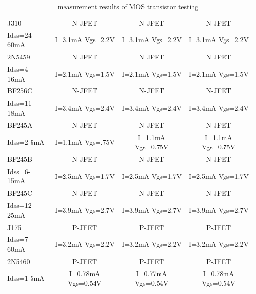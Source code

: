 \begin{table}[H]
\begin{center}
\begin{tabular}{| l | c | c | c |}
    \hline
J310         & N-JFET           & N-JFET           & N-JFET\\
Idss=24-60mA & I=3.1mA Vgs=2.2V & I=3.1mA Vgs=2.2V & I=3.1mA Vgs=2.2V \\
    \hline
2N5459       & N-JFET           & N-JFET           & N-JFET\\
Idss=4-16mA & I=2.1mA Vgs=1.5V & I=2.1mA Vgs=1.5V & I=2.1mA Vgs=1.5V \\
    \hline
BF256C       & N-JFET           & N-JFET           & N-JFET\\
Idss=11-18mA & I=3.4mA Vgs=2.4V & I=3.4mA Vgs=2.4V & I=3.4mA Vgs=2.4V \\
    \hline
BF245A       & N-JFET           & N-JFET           & N-JFET\\
Idss=2-6mA   & I=1.1mA Vgs=.75V & I=1.1mA Vgs=0.75V & I=1.1mA Vgs=0.75V \\
    \hline
BF245B       & N-JFET           & N-JFET           & N-JFET\\
Idss=6-15mA  & I=2.5mA Vgs=1.7V & I=2.5mA Vgs=1.7V & I=2.5mA Vgs=1.7V \\
    \hline
BF245C       & N-JFET           & N-JFET           & N-JFET\\
Idss=12-25mA & I=3.9mA Vgs=2.7V & I=3.9mA Vgs=2.7V & I=3.9mA Vgs=2.7V \\
    \hline
J175        & P-JFET           & P-JFET           & P-JFET\\
Idss=7-60mA & I=3.2mA Vgs=2.2V & I=3.2mA Vgs=2.2V & I=3.2mA Vgs=2.2V \\
    \hline
2N5460      & P-JFET           & P-JFET           & P-JFET\\
Idss=1-5mA  & I=0.78mA Vgs=0.54V & I=0.77mA Vgs=0.54V & I=0.78mA Vgs=0.54V \\
    \hline
    \end{tabular}
  \end{center}
  \caption{measurement results of MOS transistor testing}
  \label{tab:mos} 
\end{table}
